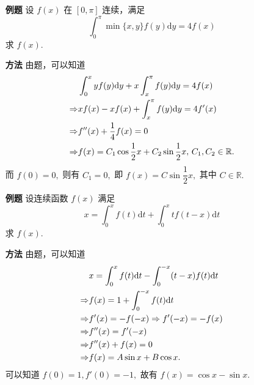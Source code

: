 \begin{enumerate}
    \item[\textbf{例题}] 设 $ f(x) $ 在 $ [0,\pi] $ 连续，满足 
    $$
        \int_0^\pi\min\{x,y\}f(y)\mathrm{d}y = 4f(x)
    $$
    求 $ f(x). $ 
    \item[\textbf{方法}] 
    由题，可以知道
    \begin{equation*}
        \begin{aligned}
            &\int_0^x yf(y)\mathrm{d}y + x\int_x^\pi f(y)\mathrm{d}y = 4f(x) \\ 
            \Rightarrow & xf(x) - xf(x) + \int_x^\pi f(y)\mathrm{d}y = 4f'(x) \\ 
            \Rightarrow & f^{\prime\prime}(x) + \dfrac{1}{4}f(x) = 0\\
            \Rightarrow & f(x) = C_1\cos \dfrac{1}{2}x + C_2\sin \dfrac{1}{2}x,
            \,C_1,C_2 \in \mathbb{R}.
        \end{aligned}
    \end{equation*}
    而 $ f(0) = 0, $ 则有 $ C_1 = 0, $ 即 $ f(x) = C\sin \dfrac{1}{2}x, $ 
    其中 $ C\in \mathbb{R}. $ 
\end{enumerate}

\begin{enumerate}
    \item[\textbf{例题}] 设连续函数 $ f(x) $ 满足 
    $$
        x = \int_0^xf(t)\mathrm{d}t + \int_0^xtf(t-x)\mathrm{d}t
    $$
    求 $ f(x). $ 
    \item[\textbf{方法}] 
    由题，可以知道
    \begin{equation*}
        \begin{aligned}
            &x = \int_0^xf(t)\mathrm{d}t - \int_0^{-x}(t-x)f(t)\mathrm{d}t\\ 
            \Rightarrow & f(x) = 1 + \int_0^{-x}f(t)\mathrm{d}t \\ 
            \Rightarrow & f'(x) = -f(-x) \Rightarrow f'(-x) = -f(x) \\ 
            \Rightarrow & f^{\prime\prime}(x) = f'(-x) \\ 
            \Rightarrow & f^{\prime\prime}(x) + f(x) = 0 \\ 
            \Rightarrow & f(x) = A\sin x + B\cos x.
        \end{aligned} 
    \end{equation*}
    可以知道 $ f(0) = 1, f'(0) = -1, $ 故有 $ f(x) = \cos x - \sin x. $ 
\end{enumerate}


